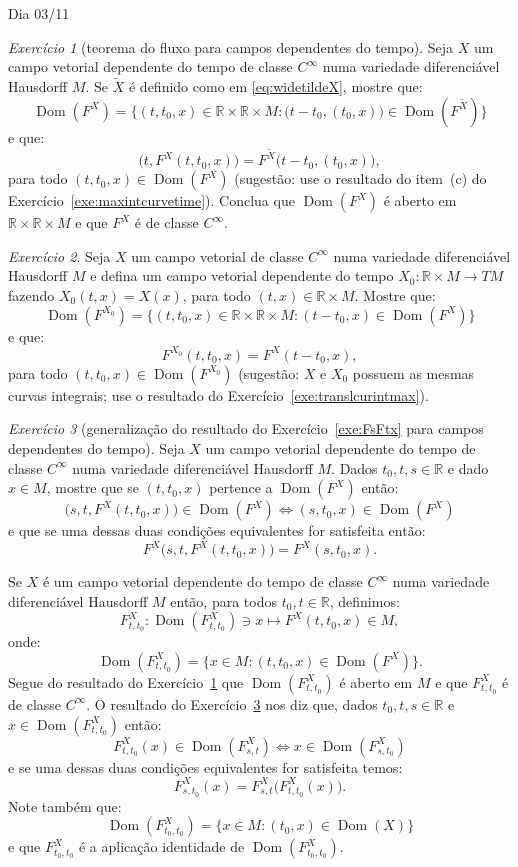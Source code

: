 \documentclass[oneside,11pt]{amsart}
\newcommand{\R}{\mathds R}
\DeclareMathOperator{\Dom}{Dom}
\theoremstyle{remark}\newtheorem{exercise}{Exercício}[section]
\theoremstyle{plain}\newtheorem{teo}{Teorema}[section]
\theoremstyle{plain}\newtheorem{lem}[teo]{Lema}
\theoremstyle{plain}\newtheorem{prop}[teo]{Proposição}
\theoremstyle{definition}\newtheorem{defin}[teo]{Definição}
\theoremstyle{remark}\newtheorem{rem}[teo]{Observação}
\theoremstyle{definition}\newtheorem{example}[teo]{Exemplo}
\numberwithin{equation}{section}
\begin{document}
\begin{section}{Dia 03/11}
\begin{exercise}[teorema do fluxo para campos dependentes do tempo]\label{exe:flowtimedep}
Seja $X$ um campo vetorial dependente do tempo de classe $C^\infty$ numa variedade diferenciável Hausdorff $M$. Se $\widetilde X$ é definido como em
\eqref{eq:widetildeX}, mostre que:
\[\Dom(F^X)=\big\{(t,t_0,x)\in\R\times\R\times M:\big(t-t_0,(t_0,x)\big)\in\Dom(F^{\widetilde X})\big\}\]
e que:
\[\big(t,F^X(t,t_0,x)\big)=F^{\widetilde X}\big(t-t_0,(t_0,x)\big),\]
para todo $(t,t_0,x)\in\Dom(F^X)$ (sugestão: use o resultado do item~(c) do Exercício~\ref{exe:maxintcurvetime}).
Conclua que $\Dom(F^X)$ é aberto em $\R\times\R\times M$ e que $F^X$ é de classe $C^\infty$.
\end{exercise}

\begin{exercise}
Seja $X$ um campo vetorial de classe $C^\infty$ numa variedade diferenciável Hausdorff $M$ e defina um campo vetorial dependente do tempo $X_0:\R\times M\to TM$
fazendo $X_0(t,x)=X(x)$, para todo $(t,x)\in\R\times M$. Mostre que:
\[\Dom(F^{X_0})=\big\{(t,t_0,x)\in\R\times\R\times M:(t-t_0,x)\in\Dom(F^X)\big\}\]
e que:
\[F^{X_0}(t,t_0,x)=F^X(t-t_0,x),\]
para todo $(t,t_0,x)\in\Dom(F^{X_0})$ (sugestão: $X$ e $X_0$ possuem as mesmas curvas integrais; use o resultado do Exercício~\ref{exe:translcurintmax}).
\end{exercise}

\begin{exercise}[generalização do resultado do Exercício~\ref{exe:FsFtx} para campos dependentes do tempo]\label{exe:FFtimedep}
Seja $X$ um campo vetorial dependente do tempo de classe $C^\infty$ numa variedade diferenciável Hausdorff $M$. Dados $t_0,t,s\in\R$ e dado $x\in M$,
mostre que se $(t,t_0,x)$ pertence a $\Dom(F^X)$ então:
\[\big(s,t,F^X(t,t_0,x)\big)\in\Dom(F^X)\Longleftrightarrow(s,t_0,x)\in\Dom(F^X)\]
e que se uma dessas duas condições equivalentes for satisfeita então:
\[F^X\big(s,t,F^X(t,t_0,x)\big)=F^X(s,t_0,x).\]
\end{exercise}

\medskip

Se $X$ é um campo vetorial dependente do tempo de classe $C^\infty$ numa variedade diferenciável Hausdorff $M$ então, para todos $t_0,t\in\R$, definimos:
\[F^X_{t,t_0}:\Dom(F^X_{t,t_0})\ni x\longmapsto F^X(t,t_0,x)\in M,\]
onde:
\[\Dom(F^X_{t,t_0})=\big\{x\in M:(t,t_0,x)\in\Dom(F^X)\big\}.\]
Segue do resultado do Exercício~\ref{exe:flowtimedep} que $\Dom(F^X_{t,t_0})$ é aberto em $M$ e que $F^X_{t,t_0}$ é de classe $C^\infty$.
O resultado do Exercício~\ref{exe:FFtimedep} nos diz que, dados $t_0,t,s\in\R$ e $x\in\Dom(F^X_{t,t_0})$ então:
\[F^X_{t,t_0}(x)\in\Dom(F^X_{s,t})\Longleftrightarrow x\in\Dom(F^X_{s,t_0})\]
e se uma dessas duas condições equivalentes for satisfeita temos:
\[F^X_{s,t_0}(x)=F^X_{s,t}\big(F^X_{t,t_0}(x)\big).\]
Note também que:
\[\Dom(F^X_{t_0,t_0})=\big\{x\in M:(t_0,x)\in\Dom(X)\big\}\]
e que $F^X_{t_0,t_0}$ é a aplicação identidade de $\Dom(F^X_{t_0,t_0})$.


\end{section}
\end{document}
